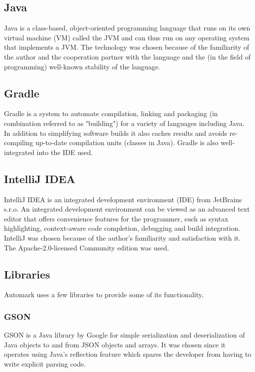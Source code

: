 \documentclass[12pt,a4paper,oneside]{report}
\begin{document}
	\subsection{Java} \label{subsec:java}
	Java is a class-based, object-oriented programming language that runs on its own virtual machine (VM) called the JVM and can thus run on any operating system that implements a JVM\parencite{oraclethejavalangenvironment}. The technology was chosen because of the familiarity of the author and the cooperation partner with the language and the (in the field of programming) well-known stability of the language.

	\subsection{Gradle} \label{subsec:gradle}
	Gradle is a system to automate compilation, linking and packaging (in combination referred to as "building") for a variety of languages including Java. In addition to simplifying software builds it also caches results and avoids re-compiling up-to-date compilation units (classes in Java). Gradle is also well-integrated into the IDE used.\parencite{gradlewebsite}

	\subsection{IntelliJ IDEA} \label{subsec:intellijidea}
	IntelliJ IDEA is an integrated development environment (IDE) from JetBrains s.r.o. \parencite{intellijwebsite} An integrated development environment can be viewed as an advanced text editor that offers convenience features for the programmer, such as syntax highlighting, context-aware code completion, debugging and build integration\parencite{stevenjzeilintegrated}\parencite{idewikipedia}. IntelliJ was chosen because of the author's familiarity and satisfaction with it. The Apache-2.0-licensed Community edition was used.

	\subsection{Libraries}
	Automark uses a few libraries to provide some of its functionality.

	\subsubsection{GSON} \label{subsubsec:gson}
	GSON is a Java library by Google for simple serialization and deserialization of Java objects to and from JSON objects and arrays\parencite{gsongithub}. It was chosen since it operates using Java's reflection feature which spares the developer from having to write explicit parsing code.
\end{document}
